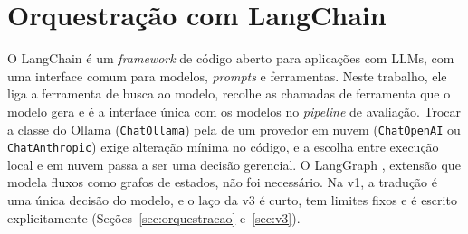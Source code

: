 \begin{table}[h]
\centering
\caption{Modelos avaliados, com suporte a \textit{Tool Calling} no Ollama}
\label{tab:modelos_toolcalling}
\end{table}

\section{Orquestração com LangChain}

O LangChain \cite{langchain2022} é um \textit{framework} de código aberto para aplicações com LLMs, com uma interface comum para modelos, \textit{prompts} e ferramentas. Neste trabalho, ele liga a ferramenta de busca ao modelo, recolhe as chamadas de ferramenta que o modelo gera e é a interface única com os modelos no \textit{pipeline} de avaliação. Trocar a classe do Ollama (\texttt{ChatOllama}) pela de um provedor em nuvem (\texttt{ChatOpenAI} ou \texttt{ChatAnthropic}) exige alteração mínima no código, e a escolha entre execução local e em nuvem passa a ser uma decisão gerencial. O LangGraph \cite{langgraph2024}, extensão que modela fluxos como grafos de estados, não foi necessário. Na v1, a tradução é uma única decisão do modelo, e o laço da v3 é curto, tem limites fixos e é escrito explicitamente (Seções~\ref{sec:orquestracao} e~\ref{sec:v3}).

